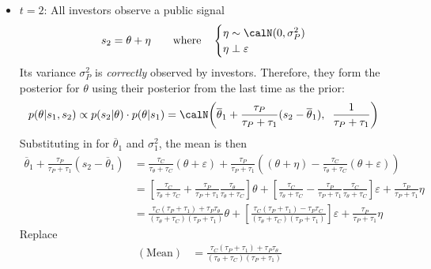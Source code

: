 \documentclass[12pt]{article}
\theoremstyle{plain}
\theoremstyle{definition}
\theoremstyle{remark}
\begin{document}
\begin{itemize}
  \item $t=2$:
    All investors observe a public signal
    \begin{align*}
      s_2
      = \theta + \eta
      \qquad\text{where}\quad
      \begin{cases}
        \eta \sim \calN(0,\sigma^2_P) \\
        \eta \perp \varepsilon
      \end{cases}
    \end{align*}
    Its variance $\sigma^2_P$ is \emph{correctly} observed by investors.
    Therefore, they form the posterior for $\theta$ using their
    posterior from the last time as the prior:
    \begin{align*}
      p(\theta|s_1,s_2)
      &\propto
      p(s_2|\theta)
      \cdot
      p(\theta|s_1)
      =
      \calN\bigg(
        \overline{\theta}_1
        +
        \frac{\tau_P}{\tau_P+\tau_1}
        (s_2-\overline{\theta}_1)
        ,\;\;
        \frac{1}{\tau_P+\tau_1}
      \bigg)
    \end{align*}
    Substituting in for $\overline{\theta}_1$ and $\sigma^2_1$, the mean
    is then
    \begin{align*}
      \overline{\theta}_1
      +
      \frac{\tau_P}{\tau_P+\tau_1}
      (s_2-\overline{\theta}_1)
      &=
      \frac{\tau_C}{\tau_\theta+\tau_C}
      (\theta+\varepsilon)
      +
      \frac{\tau_P}{\tau_P+\tau_1}
      \left(
        (\theta+\eta)
        -\frac{\tau_C}{\tau_\theta+\tau_C}
        (\theta+\varepsilon)
      \right)
      \\
      &=
      \left[
      \frac{\tau_C}{\tau_\theta+\tau_C}
      +
      \frac{\tau_P}{\tau_P+\tau_1}
      \frac{\tau_\theta}{\tau_\theta+\tau_C}
      \right]
      \theta
      +
      \left[
      \frac{\tau_C}{\tau_\theta+\tau_C}
      -
      \frac{\tau_P}{\tau_P+\tau_1}
      \frac{\tau_C}{\tau_\theta+\tau_C}
      \right]
      \varepsilon
      +
      \frac{\tau_P}{\tau_P+\tau_1}
      \eta
      \\
      &=
      \frac{\tau_C(\tau_P+\tau_1)+\tau_P\tau_\theta}{(\tau_\theta+\tau_C)(\tau_P+\tau_1)}
      \theta
      +
      \left[
      \frac{\tau_C(\tau_P+\tau_1)-\tau_P\tau_C}{(\tau_\theta+\tau_C)(\tau_P+\tau_1)}
      \right]
      \varepsilon
      +
      \frac{\tau_P}{\tau_P+\tau_1}
      \eta
    \end{align*}
    Replace
    \begin{align*}
      (\text{Mean})
      &=
      \frac{\tau_C(\tau_P+\tau_1)+\tau_P\tau_\theta}{(\tau_\theta+\tau_C)(\tau_P+\tau_1)}

\end{align*}
\end{itemize}
\end{document}
